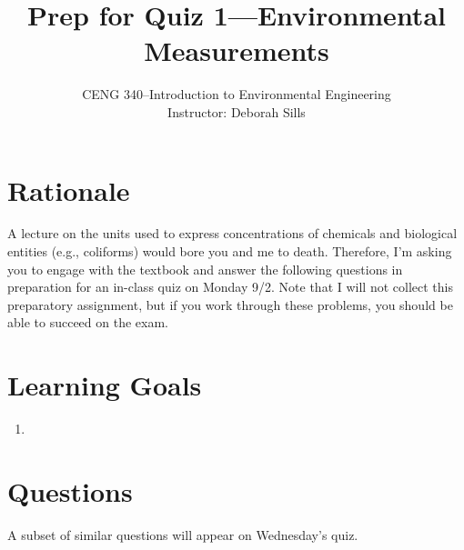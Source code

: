 \documentclass[12pt,letterpaper]{article}
\begin{document}
\setlength{\parindent}{0cm} 


\frenchspacing






\title {Prep for Quiz 1---Environmental Measurements} 
\author {CENG 340--Introduction to Environmental Engineering\\
Instructor: Deborah Sills}
\maketitle

\section *{Rationale}
A lecture on the units used to express concentrations of chemicals and biological entities (e.g., coliforms) would bore you and me to death. Therefore, I'm asking you to engage with the textbook and answer the following questions in preparation for an in-class quiz on Monday 9/2. Note that I will not collect this preparatory assignment, but if you work through these problems, you should be able to succeed on the exam.

\section *{Learning Goals}
\begin{enumerate}
\item 
\end{enumerate}

\section *{Questions}
A subset of similar questions will appear on Wednesday's quiz.
\end{document}
